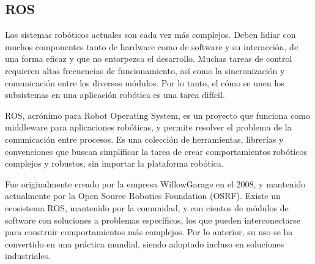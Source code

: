 \subsection{ROS}

Los sistemas rob\'oticos actuales son cada vez m\'as complejos. Deben lidiar con muchos componentes tanto de hardware como de software y su interacci\'on, de una forma eficaz y que no entorpezca el desarrollo. Muchas tareas de control requieren altas frecuencias de funcionamiento, as\'i como la sincronizaci\'on y comunicaci\'on entre los diversos m\'odulos. Por lo tanto, el c\'omo se unen los subsistemas en una aplicaci\'on rob\'otica es una tarea dif\'icil.

ROS\cite{ROS:2009}, acr\'onimo para Robot Operating System, es un proyecto que funciona como middleware para aplicaciones rob\'oticas, y permite resolver el problema de la comunicaci\'on entre procesos. Es una colecci\'on de herramientas, librer\'ias y convenciones que buscan simplificar la tarea de crear comportamientos rob\'oticos complejos y robustos, sin importar la plataforma rob\'otica.

Fue originalmente creado por la empresa WillowGarage en el 2008, y mantenido actualmente por la Open Source Robotics Foundation (OSRF). Existe un ecosistema ROS, mantenido por la comunidad, y con cientos de m\'odulos de software con soluciones a problemas espec\'ificos, los que pueden interconectarse para construir comportamientos m\'as complejos. Por lo anterior, su uso se ha convertido en una pr\'actica mundial, siendo adoptado incluso en soluciones industriales.


%
%
%
%
%


